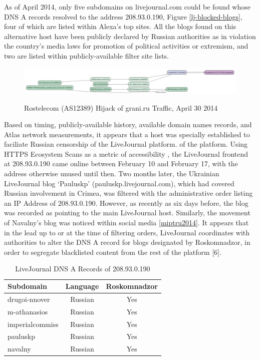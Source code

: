 As of April 2014, only five subdomains on livejournal.com could be found whose
DNS A records resolved to the address 208.93.0.190, Figure
\ref{lj-blocked-blogs}, four of which are listed within Alexa's top sites. All
the blogs found on this alternative host have been publicly declared by Russian
authorities as in violation the country's media laws for promotion of political
activities or extremism, and two are listed within publicly-available filter
site lists. 

\begin{figure}
  \includegraphics[width=\textwidth]{resources/atlas_cache-results-measurement_id-1663748.png}
  \label{image:ru-grani-hijack}
  \caption{Rostelecom (AS12389) Hijack of grani.ru Traffic, April 30 2014}
\end{figure}

Based on timing, publicly-available history, available domain names records,
and Atlas network measurements, it appears that a host was specially
established to faciliate Russian censorship of the LiveJournal platform.
of the platform. Using HTTPS Ecosystem Scans as a metric of accessibility
\cite{projectsonar}, the LiveJournal frontend at 208.93.0.190 came online
between February 10 and February 17, with the address otherwise unused until
then. Two months later, the Ukrainian LiveJournal blog `Pauluskp'
(pauluskp.livejournal.com), which had covered Russian involvement in Crimea,
was filtered with the administrative order listing an IP Address of
208.93.0.190. However, as recently as six days before, the blog was recorded as
pointing to the main LiveJournal host. Similarly, the movement of Navalny's
blog was noticed within social media \ref{miptru2014}. It appears that in the
lead up to or at the time of filtering orders, LiveJournal coordinates with
authorities to alter the DNS A record for blogs designated by Roskomnadzor, in
order to segregate blacklisted content from the rest of the platform [6].

\begin{table}
    \begin{tabular}{l | c | c}
        \textbf{Subdomain} & \textbf{Language} & \textbf{Roskomnadzor}\\
        \hline
        drugoi-nnover & Russian & Yes\\
        m-athanasios & Russian & Yes\\
        imperialcommiss & Russian & Yes\\
        pauluskp & Russian & Yes \\
        navalny & Russian & Yes \\
        \hline
    \end{tabular}
    \label{table:lj-blocked-blogs}
    \caption{LiveJournal DNS A Records of 208.93.0.190}
\end{table}


